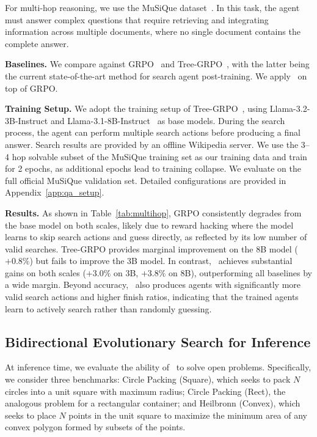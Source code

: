 For multi-hop reasoning, we use the MuSiQue dataset~\citep{musique}. In this task, the agent must answer complex questions that require retrieving and integrating information across multiple documents, where no single document contains the complete answer. 

\textbf{Baselines.} We compare against GRPO~\citep{dsr1} and Tree-GRPO~\citep{treegrpo}, with the latter being the current state-of-the-art method for search agent post-training. We apply \ours\ on top of GRPO.

\textbf{Training Setup.} We adopt the training setup of Tree-GRPO~\citep{treegrpo}, using Llama-3.2-3B-Instruct and Llama-3.1-8B-Instruct~\citep{llama3} as base models. During the search process, the agent can perform multiple search actions before producing a final answer. Search results are provided by an offline Wikipedia server. We use the 3--4 hop solvable subset of the MuSiQue training set as our training data and train for 2 epochs, as additional epochs lead to training collapse. We evaluate on the full official MuSiQue validation set. Detailed configurations are provided in Appendix~\ref{app:qa_setup}.

\textbf{Results.} As shown in Table~\ref{tab:multihop}, GRPO consistently degrades from the base model on both scales, likely due to reward hacking where the model learns to skip search actions and guess directly, as reflected by its low number of valid searches. Tree-GRPO provides marginal improvement on the 8B model ($+0.8\%$) but fails to improve the 3B model. In contrast, \ours\ achieves substantial gains on both scales ($+3.0\%$ on 3B, $+3.8\%$ on 8B), outperforming all baselines by a wide margin. Beyond accuracy, \ours\ also produces agents with significantly more valid search actions and higher finish ratios, indicating that the trained agents learn to actively search rather than randomly guessing.



\subsection{Bidirectional Evolutionary Search for Inference}
At inference time, we evaluate the ability of \ours\ to solve open problems. Specifically, we consider three benchmarks: Circle Packing (Square), which seeks to pack $N$ circles into a unit square with maximum radius; Circle Packing (Rect), the analogous problem for a rectangular container; and Heilbronn (Convex), which seeks to place $N$ points in the unit square to maximize the minimum area of any convex polygon formed by subsets of the points.

